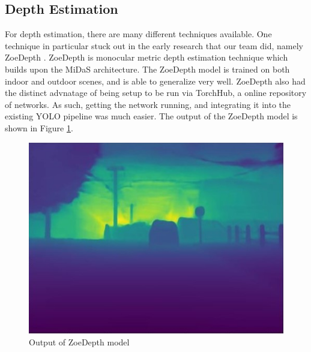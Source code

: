 \subsection{Depth Estimation}
For depth estimation, there are many different techniques available. One technique in particular stuck out in the early research that our team did, namely ZoeDepth \cite{ZoeDepth}. ZoeDepth is monocular metric depth estimation technique which builds upon the MiDaS architecture. The ZoeDepth model is trained on both indoor and outdoor scenes, and is able to generalize very well. ZoeDepth also had the distinct advnatage of being setup to be run via TorchHub, a online repository of networks. As such, getting the network running, and integrating it into the existing YOLO pipeline was much easier. The output of the ZoeDepth model is shown in Figure \ref{fig:zoe_depth_output}.

\begin{figure}
    \centering
    \includegraphics[width=0.95\linewidth]{images/depth.jpg}
    \caption{Output of ZoeDepth model}
    \label{fig:zoe_depth_output}
\end{figure}

